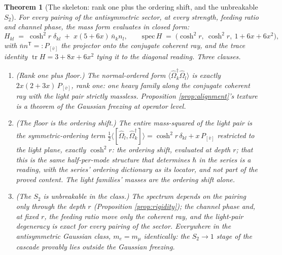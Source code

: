 \documentclass[11pt]{article}
\newtheorem{theorem}{Theorem}[section]
\theoremstyle{definition}
\newcommand{\tr}{\operatorname{tr}}
\begin{document}
\begin{theorem}[The skeleton: rank one plus the ordering shift, and the unbreakable $S_{2}$]\label{thm:skeleton}
For every pairing of the antisymmetric sector, at every strength, feeding ratio and channel phase, the mass form evaluates in closed form:
\begin{equation}\label{eq:H}
H_{kl} \;=\; \cosh^{2}r\;\delta_{kl} \;+\; x(5+6x)\,\bar{n}_{k}n_{l},
\qquad
\mathrm{spec}\,H \;=\; \bigl(\cosh^{2}r,\ \cosh^{2}r,\ 1 + 6x + 6x^{2}\bigr),
\end{equation}
with $\bar{n}n^{\mathsf{T}} =: P_{[\bar{v}]}$ the projector onto the conjugate coherent ray, and the trace identity $\tr H = 3 + 8x + 6x^{2}$ tying it to the diagonal reading. Three clauses.
\begin{enumerate}
\item \emph{(Rank one plus floor.)} The normal-ordered form $\langle\hat\Omega_{k}^{\dagger}\hat\Omega_{l}\rangle$ is exactly $2x(2+3x)\,P_{[\bar v]}$, rank one: one heavy family along the conjugate coherent ray with the light pair strictly massless. Proposition \ref{prop:alignment}'s texture is a theorem of the Gaussian freezing at operator level.
\item \emph{(The floor is the ordering shift.)} The entire mass-squared of the light pair is the symmetric-ordering term $\tfrac12\langle[\hat\Omega_{l}, \hat\Omega_{k}^{\dagger}]\rangle = \cosh^{2}r\,\delta_{kl} + x\,P_{[\bar v]}$ restricted to the light plane, exactly $\cosh^{2}r$: the ordering shift, evaluated at depth $r$; that this is the same half-per-mode structure that determines $\hbar$ in the series is a reading, with the series' ordering dictionary \cite[Thm.~5.7]{ButlerT9} as its locator, and not part of the proved content. The light families' masses are the ordering shift alone.
\item \emph{(The $S_{2}$ is unbreakable in the class.)} The spectrum depends on the pairing only through the depth $r$ (Proposition \ref{prop:rigidity}); the channel phase and, at fixed $r$, the feeding ratio move only the coherent ray, and the light-pair degeneracy is exact for every pairing of the sector. Everywhere in the antisymmetric Gaussian class, $m_{e} = m_{\mu}$ identically: the $S_{2} \to 1$ stage of the cascade provably lies outside the Gaussian freezing.
\end{enumerate}
\end{theorem}
\end{document}

